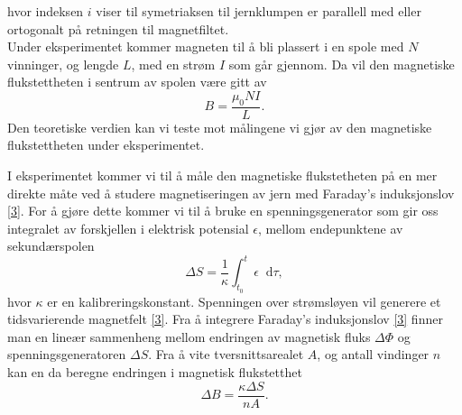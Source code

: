 \documentclass[%
 reprint,
 amsmath,amssymb,
 aps,
]{revtex4-1}
\newcommand*\diff{\mathop{}\!\mathrm{d}}
\begin{document}
hvor indeksen $i$ viser til symetriaksen til jernklumpen er parallell med eller ortogonalt på retningen til magnetfiltet.
\\Under eksperimentet kommer magneten til å bli plassert i en spole med $N$ vinninger, og lengde $L$, med en strøm $I$ som går gjennom. Da vil den magnetiske flukstettheten i sentrum av spolen være gitt av
\begin{equation}
  B = \frac{\mu_0NI}{L}.
\end{equation}Den teoretiske verdien kan vi teste mot målingene vi gjør av den magnetiske flukstettheten under eksperimentet.
\par
I eksperimentet kommer vi til å måle den magnetiske flukstetheten på en mer direkte måte ved å studere magnetiseringen av jern med Faraday's induksjonslov \eqref{3}. For å gjøre dette kommer vi til å bruke en spenningsgenerator som gir oss integralet av forskjellen i elektrisk potensial $\epsilon$, mellom endepunktene av sekundærspolen
\begin{equation}
  \Delta S = \frac{1}{\kappa}\int_{t_0}^{t}\epsilon \diff \tau, \label{deltas}
\end{equation}
hvor $\kappa$ er en kalibreringskonstant. Spenningen over strømsløyen vil generere et tidsvarierende magnetfelt \eqref{3}. Fra å integrere Faraday's induksjonslov \eqref{3} finner man en lineær sammenheng mellom endringen av magnetisk fluks $\Delta \Phi$ og spenningsgeneratoren $\Delta S$. Fra å vite tversnittsarealet $A$, og antall vindinger $n$ kan en da beregne endringen i magnetisk flukstetthet
\begin{equation}
  \Delta B = \frac{\kappa\Delta S}{nA}.\label{deltab}
\end{equation}
\end{document}
